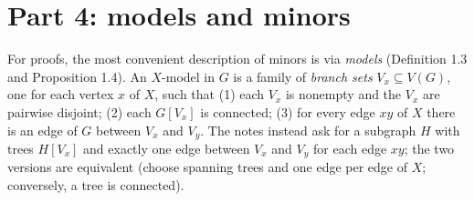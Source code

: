 \documentclass[11pt,a4paper]{article}
\begin{document}
\section{Part 4: models and minors}

For proofs, the most convenient description of minors is via \emph{models} (Definition 1.3 and
Proposition 1.4). An $X$-model in $G$ is a family of \emph{branch sets} $V_x \subseteq V(G)$, one
for each vertex $x$ of $X$, such that
(1) each $V_x$ is nonempty and the $V_x$ are pairwise disjoint;
(2) each $G[V_x]$ is connected;
(3) for every edge $xy$ of $X$ there is an edge of $G$ between $V_x$ and $V_y$.
The notes instead ask for a subgraph $H$ with trees $H[V_x]$ and exactly one edge between $V_x$
and $V_y$ for each edge $xy$; the two versions are equivalent (choose spanning trees and one edge
per edge of $X$; conversely, a tree is connected).
\end{document}
